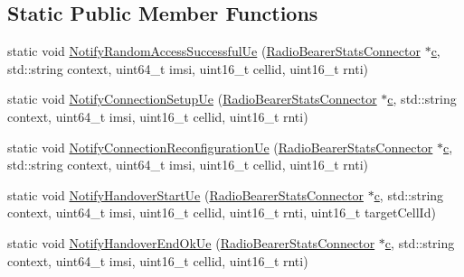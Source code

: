 \subsection*{Static Public Member Functions}
\begin{DoxyCompactItemize}
\item 
static void \hyperlink{classns3_1_1RadioBearerStatsConnector_a2bd1e59ad20e4959925ee606ac324a42}{Notify\+Random\+Access\+Successful\+Ue} (\hyperlink{classns3_1_1RadioBearerStatsConnector}{Radio\+Bearer\+Stats\+Connector} $\ast$\hyperlink{mmwave_2model_2fading-traces_2fading__trace__generator_8m_ae0323a9039add2978bf5b49550572c7c}{c}, std\+::string context, uint64\+\_\+t imsi, uint16\+\_\+t cellid, uint16\+\_\+t rnti)
\item 
static void \hyperlink{classns3_1_1RadioBearerStatsConnector_a05f976a2e57144b790462f643eff9600}{Notify\+Connection\+Setup\+Ue} (\hyperlink{classns3_1_1RadioBearerStatsConnector}{Radio\+Bearer\+Stats\+Connector} $\ast$\hyperlink{mmwave_2model_2fading-traces_2fading__trace__generator_8m_ae0323a9039add2978bf5b49550572c7c}{c}, std\+::string context, uint64\+\_\+t imsi, uint16\+\_\+t cellid, uint16\+\_\+t rnti)
\item 
static void \hyperlink{classns3_1_1RadioBearerStatsConnector_a6323adcb2b6c9b07dd63df66e8992707}{Notify\+Connection\+Reconfiguration\+Ue} (\hyperlink{classns3_1_1RadioBearerStatsConnector}{Radio\+Bearer\+Stats\+Connector} $\ast$\hyperlink{mmwave_2model_2fading-traces_2fading__trace__generator_8m_ae0323a9039add2978bf5b49550572c7c}{c}, std\+::string context, uint64\+\_\+t imsi, uint16\+\_\+t cellid, uint16\+\_\+t rnti)
\item 
static void \hyperlink{classns3_1_1RadioBearerStatsConnector_a528848db35aea0f5cf5bd50973649ed0}{Notify\+Handover\+Start\+Ue} (\hyperlink{classns3_1_1RadioBearerStatsConnector}{Radio\+Bearer\+Stats\+Connector} $\ast$\hyperlink{mmwave_2model_2fading-traces_2fading__trace__generator_8m_ae0323a9039add2978bf5b49550572c7c}{c}, std\+::string context, uint64\+\_\+t imsi, uint16\+\_\+t cellid, uint16\+\_\+t rnti, uint16\+\_\+t target\+Cell\+Id)
\item 
static void \hyperlink{classns3_1_1RadioBearerStatsConnector_a8923d2a7ed62c2fd37473f5a550a6323}{Notify\+Handover\+End\+Ok\+Ue} (\hyperlink{classns3_1_1RadioBearerStatsConnector}{Radio\+Bearer\+Stats\+Connector} $\ast$\hyperlink{mmwave_2model_2fading-traces_2fading__trace__generator_8m_ae0323a9039add2978bf5b49550572c7c}{c}, std\+::string context, uint64\+\_\+t imsi, uint16\+\_\+t cellid, uint16\+\_\+t rnti)

\end{DoxyCompactItemize}

